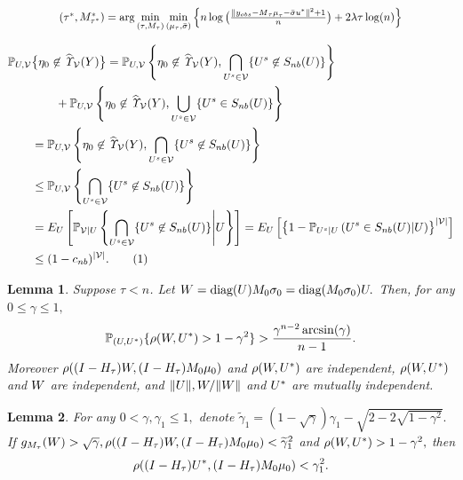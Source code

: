 \documentclass[10pt,a4paper]{amsart}
\newtheorem{lemma}{Lemma}
\def\P{\mathbb P}
\newcommand{\diag}{\hbox{diag}}
\newcommand\numberthis{\addtocounter{equation}{1}\tag{\theequation}}
\begin{document}
\begin{equation}
    \label{eq:modefied_BIC}
    \resizebox{.8\hsize}{!}{$(\tau^*, \*M^*_{\tau^*}) =\arg\min\limits_{(\tau, \*M_\tau)} \min\limits_{(\*\mu_\tau, \bar\sigma)}  \left\{n\log \big(\frac{\|\*y_{obs} - {\*M}_{\tau} {\*\mu}_{\tau} - \bar\sigma \*u^*\|^2
+1}{n}\big) + 2\lambda\tau\log(n)\right\}$}
\end{equation}

\begin{align*} 
& \P_{\*U, \mathcal V}\big\{\eta_0 \not\in \widehat{\it \Upsilon}_{{\mathcal V}}(\*Y)\big\}  = \P_{\*U, \mathcal V}\left\{\eta_0 \not\in \widehat{\it \Upsilon}_{{\mathcal V}}(\*Y), \bigcap_{\*U^s \in \mathcal V}\{\*U^s \not\in S_{nb}(\*U)\}\right\} \\ & \qquad \qquad  
 +  \P_{\*U, \mathcal V}\left\{\eta_0 \not\in \widehat{\it \Upsilon}_{{\mathcal V}}(\*Y), \bigcup_{\*U^s \in \mathcal V}\{\*U^s \in S_{nb}(\*U)\}\right\}\\ & \qquad   = \P_{\*U, \mathcal V}\left\{\eta_0 \not\in \widehat{\it \Upsilon}_{{\mathcal V}}(\*Y), \bigcap_{\*U^s \in \mathcal V}\{\*U^s \not\in S_{nb}(\*U)\}\right\} \\
& \qquad \leq \P_{\*U, \mathcal V}\left\{ \bigcap_{\*U^s \in \mathcal V}\{\*U^s \not\in S_{nb}(\*U)\}\right\}\\
& \qquad = E_{\*U}\left[\P_{\mathcal V|U}\left\{\bigcap_{\*U^s \in \mathcal V}\{\*U^s \not\in S_{nb}(\*U)\}\middle |\*U\right\}\right] =  E_{\*U}\left[\left\{1- \P_{\*U^s|\*U}\left(\*U^s \in S_{nb}(\*U)\middle |\*U\right)\right\}^{|\mathcal V|}\right]\\
&\qquad  \leq (1-c_{nb})^{|\mathcal V|}.
\numberthis \label{eq: 1-P_delta}
\end{align*}

\begin{lemma}
\label{lem::angle}  Suppose $\tau < n$. Let $\*W= \diag(\*U)\*M_0 \*\sigma_0  = \diag(\*M_0 \*\sigma_0) \*U.$ Then, for any $0 \leq \gamma \leq 1,$ 
\begin{align}
\label{eq:angle_U_Ustar}
      \P_{(\*U, \*U^*)}\{\rho(\*W, \*U^*) > 1-\gamma^2\} > \frac{\gamma^{n-2}\arcsin (\gamma)}{n-1}. 
\end{align}
Moreover $\rho((\*I - \*H_\tau)\*W, (\*I - \*H_\tau)\*M_0\*\mu_0)$ and $\rho(\*W, \*U^*)$ are independent, $\rho(\*W, \*U^*)$ and $\*W$ are independent, and $\|\*U\|, \*W/\|\*W\|$ and $\*U^*$ are mutually independent. 
\end{lemma}

\begin{lemma}\label{lemma:u_d_sufficent} For any $0< \gamma, \gamma_1 \leq 1,$  denote $\widetilde\gamma_1=(1-\sqrt{\gamma})\gamma_1 - \sqrt{2-2\sqrt{1-\gamma^2}}.$ 
 If $g_{\*M_\tau}(\*W) > \sqrt{\gamma}, \rho((\*I - \*H_\tau)\*W, (\*I - \*H_\tau)\*M_0\*\mu_0)< \widetilde \gamma_1^2$ and $\rho(\*W, \*U^*) > 1-\gamma^2,$ then
\begin{align*}
    \rho((\*I - \*H_\tau)\*U^*, (\*I - \*H_\tau)\*M_0\*\mu_0)<  \gamma_1^2.
\end{align*}
 
\end{lemma}
\end{document}
